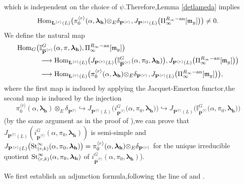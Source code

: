 \documentclass[SecEq,CM,GP]{degruyter-crelle} %
\theoremstyle{plain}
\newcommand{\ana}{{\rm an}}
\newcommand{\homo}{{\rm Hom}}
\newcommand{\lrr}{{\langle r\rangle}}
\newcommand{\op}{{\overline{{\mathbf{P}}}}}
\newcommand{\st}{{\rm St}}
\newcommand{\te}{{\otimes_E}}
\newcommand{\BI}{{\mathbb{I}}}
\newcommand{\bL}{{\mathbf{L}}}
\newcommand{\bP}{{\mathbf{P}}}
\newcommand{\bh}{{\mathbf{h}}}
\newcommand{\fm}{{\mathfrak{m}}}
\begin{document}
which is independent on the choice of $\psi$.\;Therefore,\;Lemma \ref{detlameda} implies 
\begin{equation}\label{jPinj}
\homo_{\bL^{\lrr}(L)}\big(\pi_0^{\lrr}(\alpha,{\bm\lambda}_\bh)\te \delta_{\bP^{\lrr}}, J_{\bP^{\lrr}(L)}\big(\Pi_{\infty}^{R_{\infty}-\ana}[\fm_y]\big)\big)\neq0.
\end{equation}
We define the natural map
\begin{equation}\label{adjuncitonformula}
\begin{aligned}
	\homo_{G}\big(&\BI_{\op^{\lrr}}^G(\alpha,\pi,{\bm\lambda}_\bh),\Pi_{\infty}^{R_{\infty}-\ana}[\fm_y]\big)\\
	&\longrightarrow\homo_{\bL^{\lrr}(L)}\big(J_{\bP^{\lrr}(L)}\big(\BI_{\op^{\lrr}}^G(\alpha,\pi_0,{\bm\lambda}_\bh)\big), J_{\bP^{\lrr}(L)}\big(\Pi_{\infty}^{R_{\infty}-\ana}[\fm_y]\big)\big)\\
	&\longrightarrow \homo_{\bL^{\lrr}(L)}\big(\pi_0^{\lrr}(\alpha,{\bm\lambda}_\bh)\te \delta_{\bP^{\lrr}}, J_{\bP^{\lrr}(L)}\big(\Pi_{\infty}^{R_{\infty}-\ana}[\fm_y]\big)\big),
\end{aligned}
\end{equation}
where the first map is induced by applying the Jacquet-Emerton functor,\;the second map is induced by the injection 
\[\pi_0^{\lrr}(\alpha,{\bm\lambda}_\bh)\te \delta_{\bP^{\lrr}}\hookrightarrow J_{\bP^{\lrr}(L)}\Big(i_{\op^{\lrr}}^G(\alpha,\pi_0,{\bm\lambda}_\bh\big)\Big)\hookrightarrow J_{\bP^{\lrr}(L)}\Big(\BI_{\op^{\lrr}}^G(\alpha,\pi_0,{\bm\lambda}_\bh\big)\Big)\]
(by the same argument as in the proof of \cite[Lemma 3.4]{2022ext1hyq}),\;we can prove that $J_{\bP^{\lrr}(L)}(i_{\op^{\lrr}}^G(\alpha,\pi_0,{\bm\lambda}_\bh))$ is semi-simple and $J_{\bP^{\lrr}(L)}\big(\st^{\infty}_{(r,k)}(\alpha,\pi_0,{\bm\lambda}_\bh)\big)=\pi_0^{\lrr}(\alpha,{\bm\lambda}_\bh)\te \delta_{\bP^{\lrr}}$ for the unique irreducible quotient $\st^{\infty}_{(r,k)}(\alpha,\pi_0,{\bm\lambda}_\bh)$ of $i_{\op^{\lrr}}^G(\alpha,\pi_0,{\bm\lambda}_\bh)$).

We first establish an adjunction formula,\;following the line of \cite[Proposition 4.7]{2019DINGSimple} and \cite{bergdall2018adjunction}.\;
\end{document}
